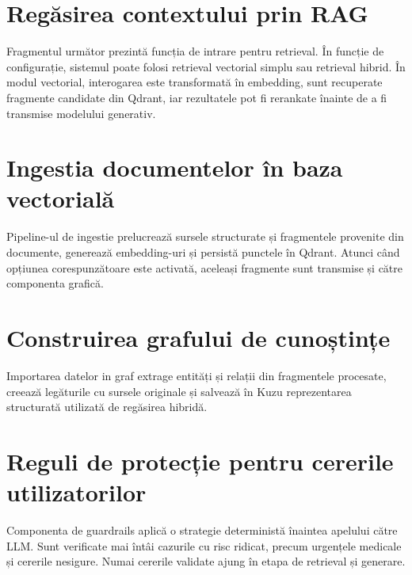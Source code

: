 \documentclass[12pt, a4paper, oneside, romanian]{teza-upb}
\begin{document}
\section{Regăsirea contextului prin RAG}

Fragmentul următor prezintă funcția de intrare pentru retrieval. În funcție de configurație, sistemul poate folosi retrieval vectorial simplu sau retrieval hibrid. În modul vectorial, interogarea este transformată în embedding, sunt recuperate fragmente candidate din Qdrant, iar rezultatele pot fi rerankate înainte de a fi transmise modelului generativ.

\label{anexa:retrieval-dispatch}


\section{Ingestia documentelor în baza vectorială}

Pipeline-ul de ingestie prelucrează sursele structurate și fragmentele provenite din documente, generează embedding-uri și persistă punctele în Qdrant. Atunci când opțiunea corespunzătoare este activată, aceleași fragmente sunt transmise și către componenta grafică.

\label{anexa:qdrant-ingestion-pipeline}


\section{Construirea grafului de cunoștințe}

 Importarea datelor in graf extrage entități și relații din fragmentele procesate, creează legăturile cu sursele originale și salvează în Kuzu reprezentarea structurată utilizată de regăsirea hibridă.

\label{anexa:graph-ingestion}


\section{Reguli de protecție pentru cererile utilizatorilor}

Componenta de guardrails aplică o strategie deterministă înaintea apelului către LLM. Sunt verificate mai întâi cazurile cu risc ridicat, precum urgențele medicale și cererile nesigure. Numai cererile validate ajung în etapa de retrieval și generare.
\end{document}

